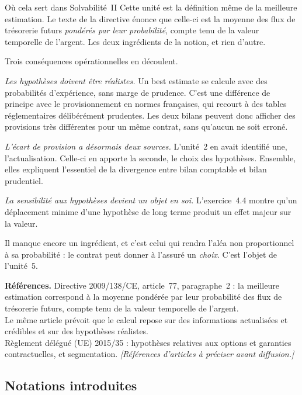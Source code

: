 \begin{pont}{Où cela sert dans Solvabilité~II}
Cette unité est la définition même de la meilleure estimation. Le texte de la
directive énonce que celle-ci est la moyenne des flux de trésorerie futurs
\emph{pondérés par leur probabilité}, compte tenu de la valeur temporelle de
l'argent. Les deux ingrédients de la notion, et rien d'autre.

\medskip
Trois conséquences opérationnelles en découlent.

\emph{Les hypothèses doivent être réalistes.} Un best estimate se calcule avec
des probabilités d'expérience, sans marge de prudence. C'est une différence de
principe avec le provisionnement en normes françaises, qui recourt à des tables
réglementaires délibérément prudentes. Les deux bilans peuvent donc afficher des
provisions très différentes pour un même contrat, sans qu'aucun ne soit erroné.

\emph{L'écart de provision a désormais deux sources.} L'unité~2 en avait
identifié une, l'actualisation. Celle-ci en apporte la seconde, le choix des
hypothèses. Ensemble, elles expliquent l'essentiel de la divergence entre bilan
comptable et bilan prudentiel.

\emph{La sensibilité aux hypothèses devient un objet en soi.} L'exercice~4.4
montre qu'un déplacement minime d'une hypothèse de long terme produit un effet
majeur sur la valeur.

\medskip
Il manque encore un ingrédient, et c'est celui qui rendra l'aléa non
proportionnel à sa probabilité : le contrat peut donner à l'assuré un
\emph{choix}. C'est l'objet de l'unité~5.
\end{pont}

\begin{refreg}
\textbf{Références.} Directive 2009/138/CE, article~77, paragraphe~2 : la
meilleure estimation correspond à la moyenne pondérée par leur probabilité des
flux de trésorerie futurs, compte tenu de la valeur temporelle de l'argent. \\
Le même article prévoit que le calcul repose sur des informations actualisées et
crédibles et sur des hypothèses réalistes. \\
Règlement délégué (UE) 2015/35 : hypothèses relatives aux options et garanties
contractuelles, et segmentation. \emph{[Références d'articles à préciser avant
diffusion.]}
\end{refreg}

\subsection*{Notations introduites}
\begin{description}[leftmargin=2.4cm, style=nextline, font=\normalfont]
\end{description}
